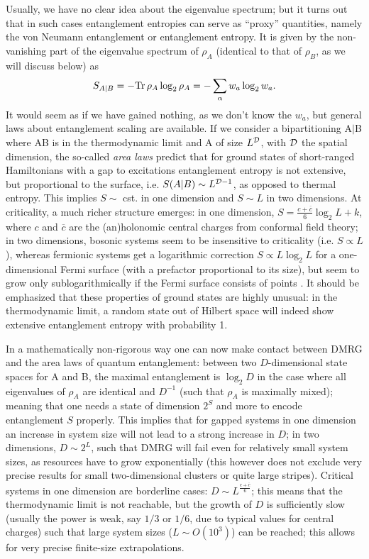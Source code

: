 \documentclass[a4paper,10pt,oneside,onecolumn,1p,times]{elsarticle}
\newcommand{\Tr}{{\rm Tr}}
\begin{document}
Usually, we have no clear idea about the eigenvalue spectrum; but it turns out that in such cases 
entanglement entropies can serve as ``proxy'' quantities, namely the von Neumann entanglement or entanglement entropy. It is given by the non-vanishing part of the eigenvalue spectrum of $\rho_A$ (identical to that of $\rho_B$, as we will discuss below) as
\begin{equation}
S_{A|B}  = - \Tr\, \rho_A \log_2 \rho_A = - \sum_\alpha w_a \log_2 w_a .
\end{equation}
It would seem as if we have gained nothing, as we don't know the $w_a$, but general laws about entanglement scaling are available. If we consider a bipartitioning A$|$B where AB is in the thermodynamic limit and A of size $L^{\cal D}$, with ${\cal D}$ the spatial dimension, the so-called {\em area laws}
\cite{Eisert10,Bekenstein73,Srednicki93,Callan94,Plenio05} predict that for ground states of short-ranged Hamiltonians with a gap to excitations entanglement entropy is not extensive, but proportional to the surface, i.e. $S(A|B) \sim L^{{\cal D}-1}$, as opposed to thermal entropy. This implies $S \sim $ cst. in one dimension and $S \sim L$ in two dimensions. At criticality, a much richer structure emerges: in one dimension,
$S = \frac{c+\overline{c}}{6} \log_2 L + k$, where $c$ and $\overline{c}$ are the (an)holonomic central charges from conformal field theory\cite{Vidal03,Latorre04}; in two dimensions, bosonic systems seem to be insensitive to criticality (i.e. $S \propto L$)\cite{Srednicki93,Barthel06}, whereas fermionic systems get a logarithmic correction $S \propto L \log_2 L$ for a one-dimensional Fermi surface (with a prefactor proportional to its size), but seem to grow only sublogarithmically if the Fermi surface consists of points \cite{Barthel06,Gioev06}. It should be emphasized that these properties of ground states are highly unusual: in the thermodynamic limit, a random state out of Hilbert space will indeed show extensive entanglement entropy with probability 1.

In a mathematically non-rigorous way one can now make contact between DMRG and the area laws of quantum entanglement: between two $D$-dimensional state spaces for A and B, the maximal entanglement is $\log_2 D$ in the case where all eigenvalues of $\rho_A$ are identical and $D^{-1}$ (such that $\rho_A$ is maximally mixed); meaning that one needs a state of dimension $2^S$ and more to encode entanglement $S$ properly. This implies that for gapped systems in one dimension an increase in system size will not lead to a strong increase in $D$; in two dimensions, $D \sim 2^L$, such that DMRG will fail even for relatively small system sizes, as resources have to grow exponentially (this however does not exclude very precise results for small two-dimensional clusters or quite large stripes). Critical systems in one dimension are borderline cases: $D \sim L^{\frac{c+\overline{c}}{6}}$; this means that the thermodynamic limit is not reachable, but the growth of $D$ is sufficiently slow (usually the power is weak, say $1/3$ or $1/6$, due to typical values for central charges) such that large system sizes ($L \sim O(10^3)$) can be reached; this allows for very precise finite-size extrapolations.
\end{document}
